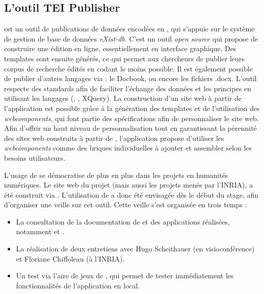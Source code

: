     \subsection{L’outil TEI Publisher}
\tp est un outil de publications de données encodées en \TEI, qui s'appuie sur le système de gestion de base de données \XML \textit{eXist-db}. C'est un outil \textit{open source} qui propose de construire une édition en ligne, essentiellement en interface graphique. Des templates \HTML sont ensuite générés, ce qui permet aux chercheurs de publier leurs corpus de recherche édités en codant le moins possible. Il est également possible de publier d'autres langages via  \tp : le \XML Docbook, \JATS ou encore les fichiers .docx. L'outil \tp respecte des standards afin de faciliter l'échange des données et les principes \fair en utilisant les langages \XML (\TEI, \ODD, XQuery). La construction d'un site web à partir de l'application \tp est possible grâce à la génération des templates \HTML et de l'utilisation des \textit{webcomponents}, qui font partie des spécifications  afin de personnaliser le site web. Afin d'offrir un haut niveau de personnalisation tout en garantissant la pérennité des sites web construits à partir de \tp, l'application propose d'utiliser les \textit{webcomponents} comme des briques individuelles à ajouter et assembler selon les besoins utilisateurs. 

L'usage de \tp se démocratise de plus en plus dans les projets en humanités numériques. Le site web du projet \cordel (mais aussi les projets menés par l'INRIA), a été construit via \tp. L'utilisation de \tp a donc été envisagée dès le début du stage, afin d'organiser une veille sur cet outil. Cette veille s'est organisée en trois temps : 

\begin{itemize}
    \item La consultation de la documentation de \tp et des applications réalisées, notamment \cordel et \disco. 
    \item La réalisation de deux entretiens avec Hugo Scheithauer (en visioconférence) et Floriane Chiffoleau (à l'INRIA). 
    \item Un test via l'\og aire de jeux \fg de \tp, qui permet de tester immédiatement les fonctionnalités de l'application en local. 
\end{itemize}

